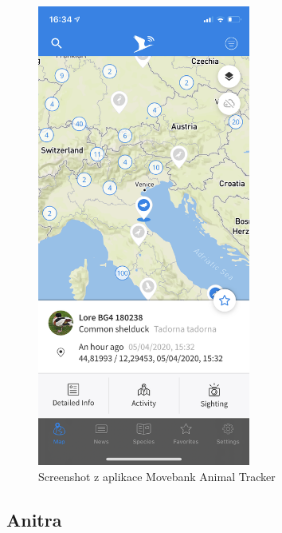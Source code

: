 \begin{figure}[h]
	\begin{center}
		\includegraphics[width=70mm]{img/animaltracker_app_movebank.png}
	\end{center}
	\caption{Screenshot z aplikace Movebank Animal Tracker}
	\label{fig:boat1}
\end{figure}


\subsection{Anitra}

